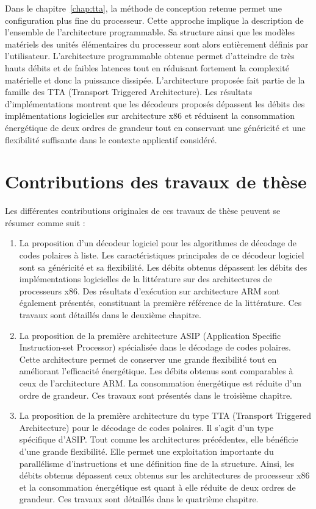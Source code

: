 Dans le chapitre~\ref{chap:tta}, la méthode de conception retenue permet une configuration plus fine du processeur. Cette approche implique la description de l'ensemble de l'architecture programmable. Sa structure ainsi que les modèles matériels des unités élémentaires du processeur sont alors entièrement définis par l'utilisateur. L'architecture programmable obtenue permet d'atteindre de très hauts débits et de faibles latences tout en réduisant fortement la complexité matérielle et donc la puissance dissipée. L'architecture proposée fait partie de la famille des TTA (Transport Triggered Architecture). Les résultats d'implémentations montrent que les décodeurs proposés dépassent les débits des implémentations logicielles sur architecture x86 et réduisent la consommation énergétique de deux ordres de grandeur tout en conservant une généricité et une flexibilité suffisante dans le contexte applicatif considéré.

\section*{Contributions des travaux de thèse}
Les différentes contributions originales de ces travaux de thèse peuvent se résumer comme suit : 
\begin{enumerate}
	\item La proposition d'un décodeur logiciel pour les algorithmes de décodage de codes polaires à liste. Les caractéristiques principales de ce décodeur logiciel sont sa généricité et sa flexibilité. Les débits obtenus dépassent les débits des implémentations logicielles de la littérature sur des architectures de processeurs x86. Des résultats d'exécution sur architecture ARM sont également présentés, constituant la première référence de la littérature. Ces travaux sont détaillés dans le deuxième chapitre.
  	\item La proposition de la première architecture ASIP (Application Specific Instruction-set Processor) spécialisée dans le décodage de codes polaires. Cette architecture permet de conserver une grande flexibilité tout en améliorant l'efficacité énergétique. Les débits obtenus sont comparables à ceux de l'architecture ARM. La consommation énergétique est réduite d'un ordre de grandeur. Ces travaux sont présentés dans le troisième chapitre.
  	\item La proposition de la première architecture du type TTA (Transport Triggered Architecture) pour le décodage de codes polaires. Il s'agit d'un type spécifique d'ASIP. Tout comme les architectures précédentes, elle bénéficie d'une grande flexibilité. Elle permet une exploitation importante du parallélisme d'instructions et une définition fine de la structure. Ainsi, les débits obtenus dépassent ceux obtenus sur les architectures de processeur x86 et la consommation énergétique est quant à elle réduite de deux ordres de grandeur. Ces travaux sont détaillés dans le quatrième chapitre.

\end{enumerate}

